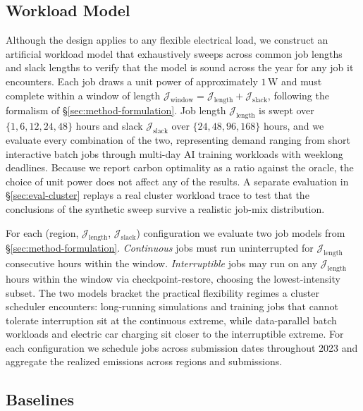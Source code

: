\subsection{Workload Model}
\label{sec:eval-workload}

Although the design applies to any flexible electrical load, we construct an artificial workload model that exhaustively sweeps across common job lengths and slack lengths to verify that the model is sound across the year for any job it encounters.
Each job draws a unit power of approximately $1\,\text{W}$ and must complete within a window of length $\mathcal{J}_{\text{window}} = \mathcal{J}_{\text{length}} + \mathcal{J}_{\text{slack}}$, following the formalism of \S\ref{sec:method-formulation}.
Job length $\mathcal{J}_{\text{length}}$ is swept over $\{1, 6, 12, 24, 48\}$ hours and slack $\mathcal{J}_{\text{slack}}$ over $\{24, 48, 96, 168\}$ hours, and we evaluate every combination of the two, representing demand ranging from short interactive batch jobs through multi-day AI training workloads with weeklong deadlines.
Because we report carbon optimality as a ratio against the oracle, the choice of unit power does not affect any of the results.
A separate evaluation in \S\ref{sec:eval-cluster} replays a real cluster workload trace to test that the conclusions of the synthetic sweep survive a realistic job-mix distribution.

For each (region, $\mathcal{J}_{\text{length}}$, $\mathcal{J}_{\text{slack}}$) configuration we evaluate two job models from \S\ref{sec:method-formulation}.
\textit{Continuous} jobs must run uninterrupted for $\mathcal{J}_{\text{length}}$ consecutive hours within the window.
\textit{Interruptible} jobs may run on any $\mathcal{J}_{\text{length}}$ hours within the window via checkpoint-restore, choosing the lowest-intensity subset.
The two models bracket the practical flexibility regimes a cluster scheduler encounters: long-running simulations and training jobs that cannot tolerate interruption sit at the continuous extreme, while data-parallel batch workloads and electric car charging sit closer to the interruptible extreme.
For each configuration we schedule jobs across submission dates throughout 2023 and aggregate the realized emissions across regions and submissions.

\subsection{Baselines}
\label{sec:eval-baselines}

